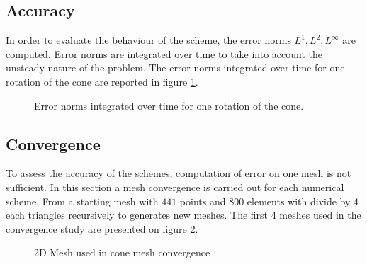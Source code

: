 \subsection{Accuracy}

In order to evaluate the behaviour of the scheme, the error norms $L^1, L^2, L^{\infty}$ are computed.
Error norms are integrated over time to take into account the unsteady nature of the problem.
The error norms integrated over time for one rotation of the cone are reported in figure \ref{t2d:cone:error_timeintegrals}.

\begin{figure}[H]
\centering
{}
\caption{Error norms integrated over time for one rotation of the cone.}
\label{t2d:cone:error_timeintegrals}
\end{figure}

\newpage
\subsection{Convergence}
To assess the accuracy of the schemes, computation of error on one mesh is not sufficient.
In this section a mesh convergence is carried out for each numerical scheme. From a starting mesh
with $441$ points and $800$ elements with divide by 4 each triangles recursively to generates new meshes.
The first 4 meshes used in the convergence study are presented on figure \ref{t2d:cone:meshes}. 

\begin{figure}[h!]
\begin{minipage}[t]{0.5\textwidth}
 \centering
\end{minipage}%
\begin{minipage}[t]{0.5\textwidth}
 \centering
\end{minipage}
\begin{minipage}[t]{0.5\textwidth}
 \centering
\end{minipage}%
\begin{minipage}[t]{0.5\textwidth}
 \centering
\end{minipage}
 \caption{2D Mesh used in cone mesh convergence}
 \label{t2d:cone:meshes}
\end{figure}

